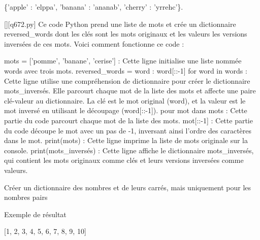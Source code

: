 \{'apple' : 'elppa', 'banana' : 'ananab', 'cherry' : 'yrrehc'\}.
        \par
        \begin{solution}
            \renewcommand{\nomfichier}{q672.py}
            \pythonfile{\chemincode \nomfichier}[][\nomfichier]
            Ce code Python prend une liste de mots et crée un dictionnaire reversed_words dont les clés sont les mots originaux et les valeurs les versions inversées de ces mots. Voici comment fonctionne ce code :

    mots = ['pomme', 'banane', 'cerise'] : Cette ligne initialise une liste nommée words avec trois mots.
    reversed_words = {word : word[::-1] for word in words} : Cette ligne utilise une compréhension de dictionnaire pour créer le dictionnaire mots_inversés. Elle parcourt chaque mot de la liste des mots et affecte une paire clé-valeur au dictionnaire. La clé est le mot original (word), et la valeur est le mot inversé en utilisant le découpage (word[::-1]).
        pour mot dans mots : Cette partie du code parcourt chaque mot de la liste des mots.
        mot[::-1] : Cette partie du code découpe le mot avec un pas de -1, inversant ainsi l'ordre des caractères dans le mot.
    print(mots) : Cette ligne imprime la liste de mots originale sur la console.
    print(mots_inversés) : Cette ligne affiche le dictionnaire mots_inversés, qui contient les mots originaux comme clés et leurs versions inversées comme valeurs.
        \end{solution}
        

        \question
        Créer un dictionnaire des nombres et de leurs carrés, mais uniquement pour les nombres pairs

Exemple de résultat

[1, 2, 3, 4, 5, 6, 7, 8, 9, 10]


